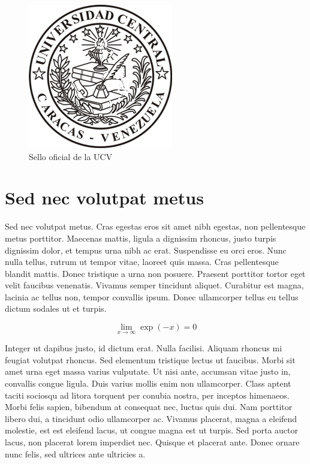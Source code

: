 \begin{figure}
\begin{center}
\includegraphics[scale=1]{logoucvgifpeq.png}
\caption{Sello oficial de la UCV \label{selloUCV}}
\end{center}
\end{figure}

\section{Sed nec volutpat metus}
Sed nec volutpat metus. Cras egestas eros sit amet nibh egestas, non pellentesque metus porttitor. Maecenas mattis, ligula a dignissim rhoncus, justo turpis dignissim dolor, et tempus urna nibh ac erat. Suspendisse eu orci eros. Nunc nulla tellus, rutrum ut tempor vitae, laoreet quis massa. Cras pellentesque blandit mattis. Donec tristique a urna non posuere. Praesent porttitor tortor eget velit faucibus venenatis. Vivamus semper tincidunt aliquet. Curabitur est magna, lacinia ac tellus non, tempor convallis ipsum. Donec ullamcorper tellus eu tellus dictum sodales ut et turpis.

\begin{equation}
	\lim_{x \to \infty} \exp(-x) = 0
\end{equation}

Integer ut dapibus justo, id dictum erat. Nulla facilisi. Aliquam rhoncus mi feugiat volutpat rhoncus. Sed elementum tristique lectus ut faucibus. Morbi sit amet urna eget massa varius vulputate. Ut nisi ante, accumsan vitae justo in, convallis congue ligula. Duis varius mollis enim non ullamcorper. Class aptent taciti sociosqu ad litora torquent per conubia nostra, per inceptos himenaeos. Morbi felis sapien, bibendum at consequat nec, luctus quis dui. Nam porttitor libero dui, a tincidunt odio ullamcorper ac. Vivamus placerat, magna a eleifend molestie, est est eleifend lacus, ut congue magna est ut turpis. Sed porta auctor lacus, non placerat lorem imperdiet nec. Quisque et placerat ante. Donec ornare nunc felis, sed ultrices ante ultricies a. 

